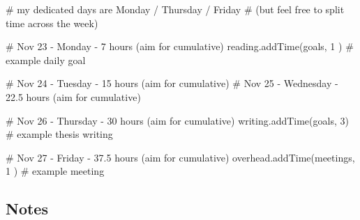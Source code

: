 \documentclass[weekly_log.tex]{subfiles}
\begin{document}
\begin{sagesilent}
    # my dedicated days are Monday / Thursday / Friday
    # (but feel free to split time across the week)

    # Nov 23  - Monday    - 7   hours  (aim for cumulative)
    reading.addTime(goals, 1 )      # example daily goal

    # Nov 24  - Tuesday   - 15 hours   (aim for cumulative)
    # Nov 25  - Wednesday - 22.5 hours (aim for cumulative)

    # Nov 26  - Thursday  - 30 hours   (aim for cumulative)
    writing.addTime(goals, 3)       # example thesis writing

    # Nov 27  - Friday    - 37.5 hours (aim for cumulative)
    overhead.addTime(meetings, 1 )  # example meeting

\end{sagesilent}



%
%    
%
%
%
%
%  
%  
%  
  
  


\subsection{Notes}

\bib{}
\end{document}
